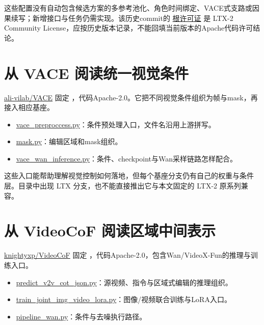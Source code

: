 这些配置没有自动包含候选方案的多参考池化、角色时间绑定、VACE式支路或因果续写；新增接口与任务仍需实现。该历史commit的 \href{https://github.com/Lightricks/LTX-2/blob/bd92a5f408eb8c99f8c05e9fe2fcaaec8b56b638/LICENSE}{根许可证} 是 LTX-2 Community License，应按历史版本记录，不能回填当前版本的Apache代码许可结论。

\section{从 VACE 阅读统一视觉条件}\label{seedance-m15-ux4ece-vace-ux9605ux8bfbux7edfux4e00ux89c6ux89c9ux6761ux4ef6}

\href{https://github.com/ali-vilab/VACE}{ali-vilab/VACE} 固定 ，代码Apache-2.0。它把不同视觉条件组织为帧与mask，再接入相应基座。

\begin{itemize}
\tightlist
\item
  \href{https://github.com/ali-vilab/VACE/blob/48eb44f1c4be87cc65a98bff985a26976841e9f3/vace/vace_preproccess.py}{vace\_preproccess.py}：条件预处理入口，文件名沿用上游拼写。
\item
  \href{https://github.com/ali-vilab/VACE/blob/48eb44f1c4be87cc65a98bff985a26976841e9f3/vace/annotators/mask.py}{mask.py}：编辑区域和mask组织。
\item
  \href{https://github.com/ali-vilab/VACE/blob/48eb44f1c4be87cc65a98bff985a26976841e9f3/vace/vace_wan_inference.py}{vace\_wan\_inference.py}：条件、checkpoint与Wan采样链路怎样配合。
\end{itemize}

这些入口能帮助理解视觉控制如何落地，但每个基座分支仍有自己的权重与条件层。目录中出现 LTX 分支，也不能直接推出它与本文固定的 LTX-2 原系列兼容。

\section{从 VideoCoF 阅读区域中间表示}\label{seedance-m15-ux4ece-videocof-ux9605ux8bfbux533aux57dfux4e2dux95f4ux8868ux793a}

\href{https://github.com/knightyxp/VideoCoF}{knightyxp/VideoCoF} 固定 ，代码Apache-2.0，包含Wan/VideoX-Fun的推理与训练入口。

\begin{itemize}
\tightlist
\item
  \href{https://github.com/knightyxp/VideoCoF/blob/f45b8009616b3ef8e2024a7da585249b4c74fc2b/examples/wan2.1/predict_v2v_cot_json.py}{predict\_v2v\_cot\_json.py}：源视频、指令与区域式编辑的推理组织。
\item
  \href{https://github.com/knightyxp/VideoCoF/blob/f45b8009616b3ef8e2024a7da585249b4c74fc2b/scripts/wan2.1/train_joint_img_video_lora.py}{train\_joint\_img\_video\_lora.py}：图像/视频联合训练与LoRA入口。
\item
  \href{https://github.com/knightyxp/VideoCoF/blob/f45b8009616b3ef8e2024a7da585249b4c74fc2b/videox_fun/pipeline/pipeline_wan.py}{pipeline\_wan.py}：条件与去噪执行路径。
\end{itemize}

